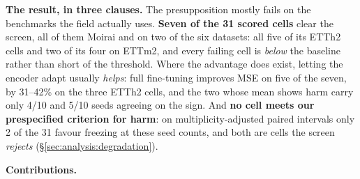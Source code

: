 \textbf{The result, in three clauses.}  The presupposition mostly fails on the
benchmarks the field actually uses.  \textbf{Seven of the 31 scored cells}
clear the screen, all of them Moirai and on two of the six datasets: all five of
its ETTh2 cells and two of its four on ETTm2, and every failing cell is
\emph{below} the baseline rather than short of the threshold.  Where the advantage does exist,
letting the encoder adapt usually \emph{helps}: full fine-tuning improves MSE on
five of the seven, by 31--42\% on the three ETTh2 cells, and the two whose mean
shows harm carry only 4/10 and 5/10 seeds agreeing on the sign.  And \textbf{no
cell meets our prespecified criterion for harm}: on multiplicity-adjusted paired
intervals
only 2 of the 31 favour freezing at these seed counts, and both are cells the
screen \emph{rejects} (\S\ref{sec:analysis:degradation}).

\textbf{Contributions.}

